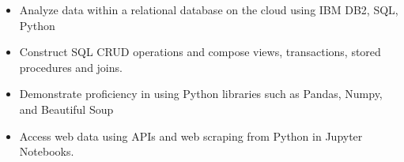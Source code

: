 \documentclass[11pt,a4paper,ragged2e]{altacv}
\begin{document}
\begin{paracol}{1}
\begin{itemize}
\item Analyze data within a relational database on the cloud using IBM DB2, SQL, Python
\item Construct SQL CRUD operations and compose views, transactions, stored procedures and joins.
\end{itemize}
\tightdivider

\begin{itemize}
\item Demonstrate proficiency in using Python libraries such as Pandas, Numpy, and Beautiful Soup
\item Access web data using APIs and web scraping from Python in Jupyter Notebooks.
\end{itemize}

\medskip





\end{paracol}
\end{document}
